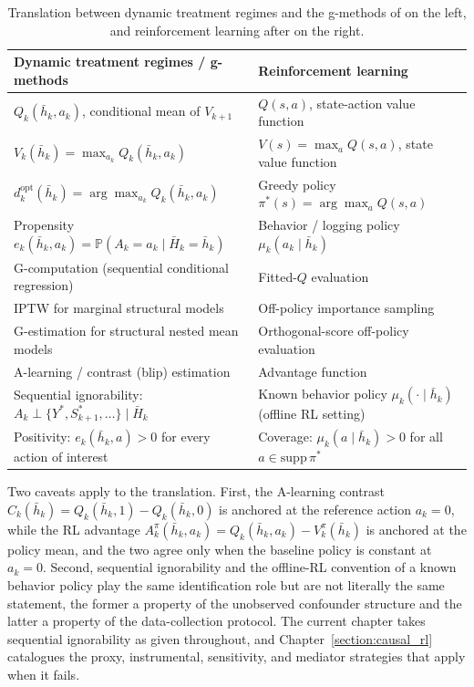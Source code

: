 \begin{table}[htbp]
\centering
\caption{Translation between dynamic treatment regimes and the g-methods of \citet{robins1986, robins2000msm, murphy2003dtr, schulte2014qlearning} on the left, and reinforcement learning after \citet{watkins1992_paper, sutton2018} on the right.}
\label{tab:rl_ci_dictionary}
{\small
\renewcommand{\arraystretch}{1.25}
\begin{tabularx}{\textwidth}{>{\raggedright\arraybackslash}X >{\raggedright\arraybackslash}X}
\toprule
Dynamic treatment regimes / g-methods & Reinforcement learning \\
\midrule
$Q_k(\bar h_k, a_k)$, conditional mean of $V_{k+1}$ & $Q(s, a)$, state-action value function \\
$V_k(\bar h_k) = \max_{a_k} Q_k(\bar h_k, a_k)$ & $V(s) = \max_a Q(s,a)$, state value function \\
$d_k^{\text{opt}}(\bar h_k) = \arg\max_{a_k} Q_k(\bar h_k, a_k)$ & Greedy policy $\pi^*(s) = \arg\max_a Q(s,a)$ \\
Propensity $e_k(\bar h_k, a_k) = \mathbb{P}(A_k = a_k \mid \bar H_k = \bar h_k)$ & Behavior / logging policy $\mu_k(a_k \mid \bar h_k)$ \\
G-computation (sequential conditional regression) & Fitted-$Q$ evaluation \citep{Ernst2005} \\
IPTW for marginal structural models \citep{robins2000msm} & Off-policy importance sampling \citep{precup2000} \\
G-estimation for structural nested mean models \citep{robins2004snmm} & Orthogonal-score off-policy evaluation \citep{lewisSyrgkanis2021dynamicDML} \\
A-learning / contrast (blip) estimation \citep{schulte2014qlearning, robins2004snmm} & Advantage function \citep{Baird1993advantage} \\
Sequential ignorability: $A_k \perp \{Y^*, S^*_{k+1}, \ldots\} \mid \bar H_k$ & Known behavior policy $\mu_k(\cdot \mid \bar h_k)$ (offline RL setting) \\
Positivity: $e_k(\bar h_k, a) > 0$ for every action of interest & Coverage: $\mu_k(a \mid \bar h_k) > 0$ for all $a \in \mathrm{supp}\,\pi^*$ \\
\bottomrule
\end{tabularx}
}
\end{table}

Two caveats apply to the translation. First, the A-learning contrast $C_k(\bar h_k) = Q_k(\bar h_k, 1) - Q_k(\bar h_k, 0)$ is anchored at the reference action $a_k = 0$, while the RL advantage $A_k^\pi(\bar h_k, a_k) = Q_k(\bar h_k, a_k) - V_k^\pi(\bar h_k)$ is anchored at the policy mean, and the two agree only when the baseline policy is constant at $a_k = 0$. Second, sequential ignorability and the offline-RL convention of a known behavior policy play the same identification role but are not literally the same statement, the former a property of the unobserved confounder structure and the latter a property of the data-collection protocol. The current chapter takes sequential ignorability as given throughout, and Chapter~\ref{section:causal_rl} catalogues the proxy, instrumental, sensitivity, and mediator strategies that apply when it fails.

